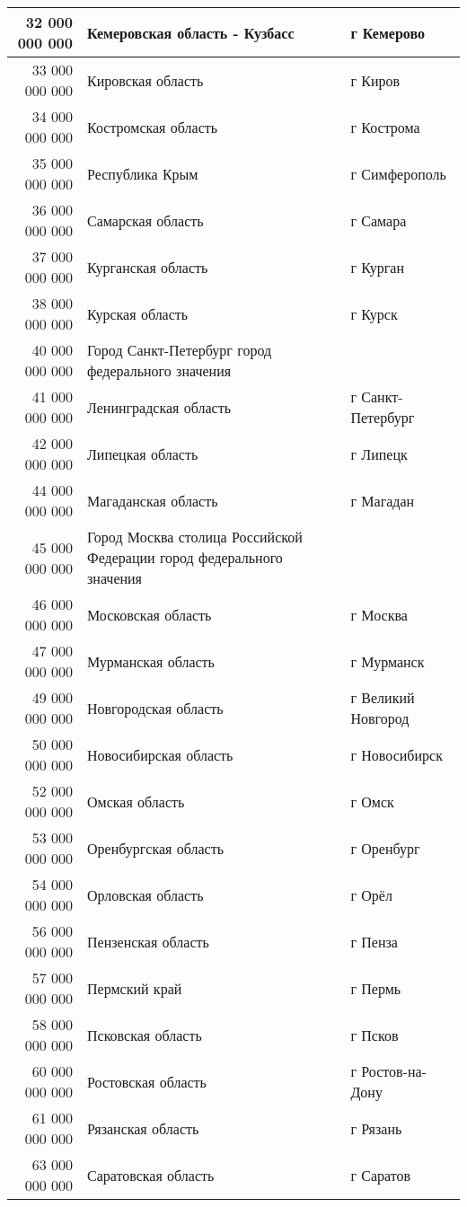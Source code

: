 \documentclass[10pt, a4paper, titlepage]{article}
\begin{document}
\begin{center}
\begin{longtable}{|r|p{}|p{}|}
    32 000 000 000 & Кемеровская область - Кузбасс & г Кемерово \\ \hline
    33 000 000 000 & Кировская область & г Киров \\ \hline
    34 000 000 000 & Костромская область & г Кострома \\ \hline
    35 000 000 000 & Республика Крым & г Симферополь \\ \hline
    36 000 000 000 & Самарская область & г Самара \\ \hline
    37 000 000 000 & Курганская область & г Курган \\ \hline
    38 000 000 000 & Курская область & г Курск \\ \hline
    40 000 000 000 & Город Санкт-Петербург город федерального значения &  \\ \hline	
    41 000 000 000 & Ленинградская область & г Санкт-Петербург \\ \hline
    42 000 000 000 & Липецкая область & г Липецк \\ \hline
    44 000 000 000 & Магаданская область & г Магадан \\ \hline
    45 000 000 000 & Город Москва столица Российской Федерации город федерального значения & \\ \hline
    46 000 000 000 & Московская область & г Москва \\ \hline
    47 000 000 000 & Мурманская область & г Мурманск \\ \hline
    49 000 000 000 & Новгородская область & г Великий Новгород \\ \hline
    50 000 000 000 & Новосибирская область & г Новосибирск \\ \hline
    52 000 000 000 & Омская область & г Омск \\ \hline
    53 000 000 000 & Оренбургская область & г Оренбург \\ \hline
    54 000 000 000 & Орловская область & г Орёл \\ \hline
    56 000 000 000 & Пензенская область & г Пенза \\ \hline
    57 000 000 000 & Пермский край & г Пермь \\ \hline
    58 000 000 000 & Псковская область & г Псков \\ \hline
    60 000 000 000 & Ростовская область & г Ростов-на-Дону \\ \hline
    61 000 000 000 & Рязанская область & г Рязань \\ \hline
    63 000 000 000 & Саратовская область & г Саратов \\ \hline

\end{longtable}
\end{center}
\end{document}
